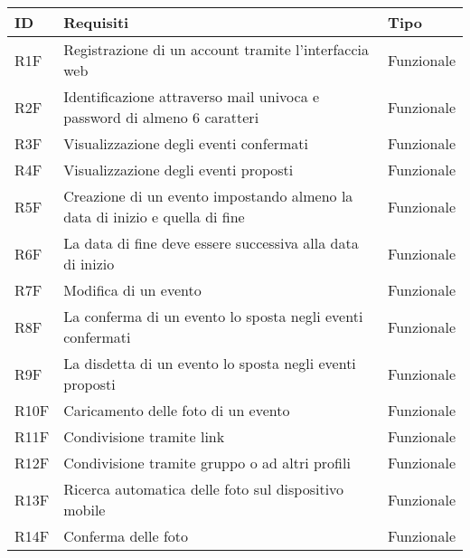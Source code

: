 \begin{table}
    \begin{tabular} {|P{1.3cm}|P{11.2cm}|P{3cm}|}
        \hline
        \textbf{ID} & \textbf{Requisiti}                                                          & \textbf{Tipo}  \\
        \hline
        R1F         & Registrazione di un account tramite l’interfaccia web                       & Funzionale     \\
        \hline
        R2F         & Identificazione attraverso mail univoca e password di almeno 6 caratteri    & Funzionale     \\
        \hline
        R3F         & Visualizzazione degli eventi confermati                                     & Funzionale     \\
        \hline
        R4F         & Visualizzazione degli eventi proposti                                       & Funzionale     \\
        \hline
        R5F         & Creazione di un evento impostando almeno la data di inizio e quella di fine & Funzionale     \\
        \hline
        R6F         & La data di fine deve essere successiva alla data di inizio                  & Funzionale     \\
        \hline
        R7F         & Modifica di un evento                                                       & Funzionale     \\
        \hline
        R8F         & La conferma di un evento lo sposta negli eventi confermati                  & Funzionale     \\
        \hline
        R9F         & La disdetta di un evento lo sposta negli eventi proposti                    & Funzionale     \\
        \hline
        R10F        & Caricamento delle foto di un evento                                         & Funzionale     \\
        \hline
        R11F        & Condivisione tramite link                                                   & Funzionale     \\
        \hline
        R12F        & Condivisione tramite gruppo o ad altri profili                              & Funzionale     \\
        \hline
        R13F        & Ricerca automatica delle foto sul dispositivo mobile                        & Funzionale     \\
        \hline
        R14F        & Conferma delle foto                                                         & Funzionale     \\

\end{tabular}
\end{table}
